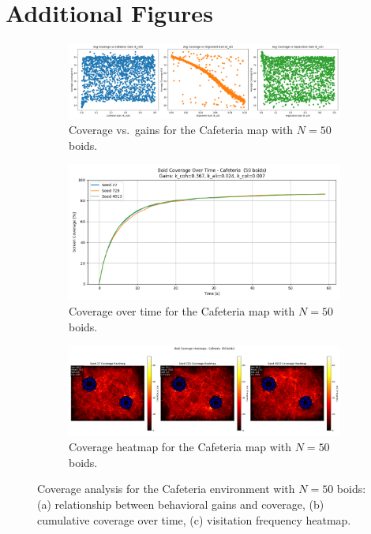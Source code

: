 \documentclass[12pt]{article}
\begin{document}
\appendix
\section{Additional Figures}

\begin{figure}[h!]
  \centering
  \begin{subfigure}[b]{0.32\linewidth}
    \includegraphics[width=\linewidth]{cov_vs_gains/cafeteria_50.png}
    \caption{Coverage vs.~gains for the Cafeteria map with $N=50$ boids.}
    \label{fig:app:caf50_gains}
  \end{subfigure}\hfill
  \begin{subfigure}[b]{0.32\linewidth}
    \includegraphics[width=\linewidth]{optimal_cov_vs_time/cafeteria_50.png}
    \caption{Coverage over time for the Cafeteria map with $N=50$ boids.}
    \label{fig:app:caf50_time}
  \end{subfigure}\hfill
  \begin{subfigure}[b]{0.32\linewidth}
    \includegraphics[width=\linewidth]{heatmaps/cafeteria_50.png}
    \caption{Coverage heatmap for the Cafeteria map with $N=50$ boids.}
    \label{fig:app:caf50_heat}
  \end{subfigure}
  \caption{Coverage analysis for the Cafeteria environment with $N=50$ boids: (a) relationship between behavioral gains and coverage, (b) cumulative coverage over time, (c) visitation frequency heatmap.}
  \label{fig:app:cafeteria50}
\end{figure}
\end{document}
